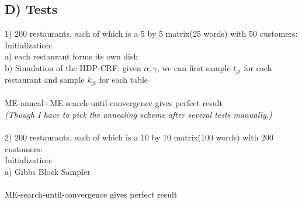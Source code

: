 \documentclass{article}
\begin{document}
\begin{spacing}{1.1}
\subsection{D) Tests}
1) 200 restaurants, each of which is a 5 by 5 matrix(25 words) with 50 customers:\\
Initialization:\\
a) each restaurant forms its own dish\\
b) Simulation of the HDP-CRF: given $\alpha,\gamma$, we can first sample $t_{ji}$ for each restaurant and sample $k_{jt}$ for each table \\ \\
ME-anneal+ME-search-until-convergence gives perfect result \\
\emph{(Though I have to pick the annealing scheme after several tests manually.)}\\ \\
2) 200 restaurants, each of which is a 10 by 10 matrix(100 words) with 200 customers:\\
Initialization:\\
a) Gibbs Block Sampler\\ \\
ME-search-until-convergence gives perfect result

\end{spacing}
\end{document}
